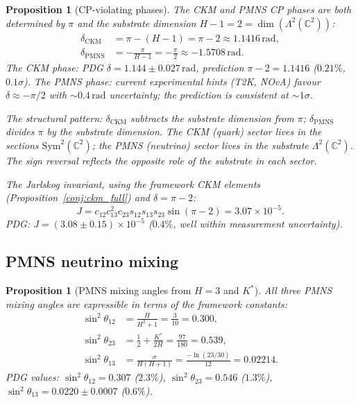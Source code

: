\documentclass[11pt,a4paper]{article}
\newtheorem{proposition}[theorem]{Proposition}
\theoremstyle{definition}
\theoremstyle{remark}
\newcommand{\C}{\mathbb{C}}
\newcommand{\Sym}{\mathrm{Sym}}
\begin{document}
\begin{proposition}[CP-violating phases]\label{prop:cp_phases}
The CKM and PMNS CP phases are both determined by $\pi$ and the substrate dimension $H-1=2=\dim(\Lambda^2(\C^2))$:
\begin{align}
\delta_{\mathrm{CKM}} &= \pi-(H-1) = \pi-2 \approx 1.1416\,\mathrm{rad}, \label{eq:delta_CKM}\\
\delta_{\mathrm{PMNS}} &= -\frac{\pi}{H-1} = -\frac{\pi}{2} \approx -1.5708\,\mathrm{rad}. \label{eq:delta_PMNS}
\end{align}
The CKM phase: PDG $\delta=1.144\pm 0.027\,\mathrm{rad}$, prediction $\pi-2=1.1416$ ($0.21\%$, $0.1\sigma$). The PMNS phase: current experimental hints (T2K, NOvA) favour $\delta\approx -\pi/2$ with $\sim\!0.4\,\mathrm{rad}$ uncertainty; the prediction is consistent at $\sim\!1\sigma$.

The structural pattern: $\delta_{\mathrm{CKM}}$ subtracts the substrate dimension from $\pi$; $\delta_{\mathrm{PMNS}}$ divides $\pi$ by the substrate dimension. The CKM (quark) sector lives in the sections $\Sym^2(\C^2)$; the PMNS (neutrino) sector lives in the substrate $\Lambda^2(\C^2)$. The sign reversal reflects the opposite role of the substrate in each sector.

The Jarlskog invariant, using the framework CKM elements (Proposition~\ref{conj:ckm_full}) and $\delta=\pi-2$:
\begin{equation}\label{eq:jarlskog}
J = c_{12}c_{13}^2c_{23}s_{12}s_{13}s_{23}\sin(\pi-2) = 3.07\times 10^{-5}.
\end{equation}
PDG: $J=(3.08\pm 0.15)\times 10^{-5}$ ($0.4\%$, well within measurement uncertainty).
\end{proposition}

\subsection{PMNS neutrino mixing}\label{sec:pmns}

\begin{proposition}[PMNS mixing angles from $H=3$ and $K^*$]\label{prop:pmns}
All three PMNS mixing angles are expressible in terms of the framework constants:
\begin{align}
\sin^2\theta_{12} &= \frac{H}{H^2+1} = \frac{3}{10} = 0.300, \label{eq:pmns12}\\
\sin^2\theta_{23} &= \frac{1}{2}+\frac{K^*}{2H} = \frac{97}{180} = 0.539, \label{eq:pmns23}\\
\sin^2\theta_{13} &= \frac{\sigma}{H(H+1)} = \frac{-\ln(23/30)}{12} = 0.02214. \label{eq:pmns13}
\end{align}
PDG values: $\sin^2\theta_{12}=0.307$ ($2.3\%$), $\sin^2\theta_{23}=0.546$ ($1.3\%$), $\sin^2\theta_{13}=0.0220\pm 0.0007$ ($0.6\%$).
\end{proposition}
\end{document}
